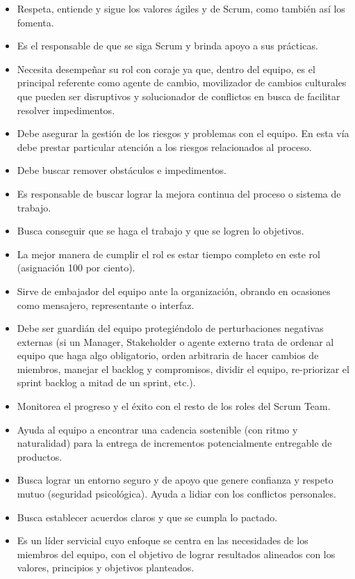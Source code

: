 \begin{itemize}
\item Respeta, entiende y sigue los valores ágiles y de Scrum, como también así los fomenta.
\item Es el responsable de que se siga Scrum y brinda apoyo a sus prácticas.
\item Necesita desempeñar su rol con coraje ya que, dentro del equipo, es el principal referente como agente de cambio, movilizador de cambios culturales que pueden ser disruptivos y solucionador de conflictos en busca de facilitar resolver impedimentos.
\item Debe asegurar la gestión de los riesgos y problemas con el equipo. En esta vía debe prestar particular atención a los riesgos relacionados al proceso.
\item Debe buscar remover obstáculos e impedimentos.
\item Es responsable de buscar lograr la mejora continua del proceso o sistema de trabajo.
\item Busca conseguir que se haga el trabajo y que se logren lo objetivos.
\item La mejor manera de cumplir el rol es estar tiempo completo en este rol (asignación 100 por ciento).
\item Sirve de embajador del equipo ante la organización, obrando en ocasiones como mensajero, representante o interfaz.
\item Debe ser guardián del equipo protegiéndolo de perturbaciones negativas externas (si un Manager, Stakeholder o agente externo trata de ordenar al equipo que haga algo obligatorio, orden arbitraria de hacer cambios de miembros, manejar el backlog y compromisos, dividir el equipo, re-priorizar el sprint backlog a mitad de un sprint, etc.).
\item Monitorea el progreso y el éxito con el resto de los roles del Scrum Team.
\item Ayuda al equipo a encontrar una cadencia sostenible (con ritmo y naturalidad) para la entrega de incrementos potencialmente entregable de productos. 
\item Busca lograr un entorno seguro y de apoyo que genere confianza y respeto mutuo (seguridad psicológica). Ayuda a lidiar con los conflictos personales.
\item Busca establecer acuerdos claros y que se cumpla lo pactado.
\item Es un líder servicial cuyo enfoque se centra en las necesidades de los miembros del equipo, con el objetivo de lograr resultados alineados con los valores, principios y objetivos planteados.

\end{itemize}
